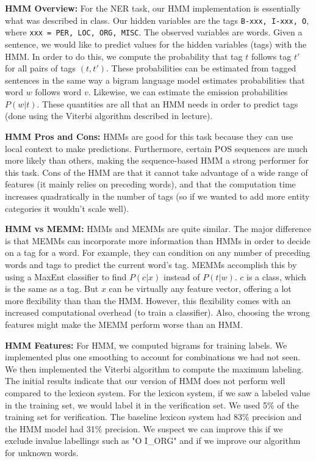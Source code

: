 \documentclass[12pt]{article}
\begin{document}
\maketitle
\textbf{HMM Overview:}
For the NER task, our HMM implementation is essentially what was described in class. Our hidden variables are the tags {\tt B-xxx, I-xxx, O}, where {\tt xxx = PER, LOC, ORG, MISC}. The observed variables are words. Given a sentence, we would like to predict values for the hidden variables (tags) with the HMM. In order to do this, we compute the probability that tag $t$ follows tag $t'$ for all pairs of tags $(t, t')$. These probabilities can be estimated from tagged sentences in the same way a bigram language model estimates probabilities that word $w$ follows word $v$. Likewise, we can estimate the emission probabilities $P(w|t)$. These quantities are all that an HMM needs in order to predict tags (done using the Viterbi algorithm described in lecture).

\textbf{HMM Pros and Cons:} HMMs are good for this task because they can use local context to make predictions. Furthermore, certain POS sequences are much more likely than others, making the sequence-based HMM a strong performer for this task. Cons of the HMM are that it cannot take advantage of a wide range of features (it mainly relies on preceding words), and that the computation time increases quadratically in the number of tags (so if we wanted to add more entity categories it wouldn't scale well).

\textbf{HMM vs MEMM:} HMMs and MEMMs are quite similar. The major difference is that MEMMs can incorporate more information than HMMs in order to decide on a tag for a word. For example, they can condition on any number of preceding words and tags to predict the current word's tag. MEMMs accomplish this by using a MaxEnt classifier to find $P(c|x)$ instead of $P(t|w)$. $c$ is a class, which is the same as a tag. But $x$ can be virtually any feature vector, offering a lot more flexibility than than the HMM. However, this flexibility comes with an increased computational overhead (to train a classifier). Also, choosing the wrong features might make the MEMM perform worse than an HMM.

\textbf{HMM Features:}
For HMM, we computed bigrams for training labels. We implemented plus one smoothing to account for combinations we had not seen. We then implemented the Viterbi algorithm to compute the maximum labeling. The initial results indicate that our version of HMM does not perform well compared to the lexicon system. For the lexicon system, if we saw a labeled value in the training set, we would label it in the verification set. We used 5\% of the training set for verification. The baseline lexicon system had 83\% precision and the HMM model had 31\% precision. We suspect we can improve this if we exclude invalue labellings such as "O I\_ORG" and if we improve our algorithm for unknown words.
\end{document}
